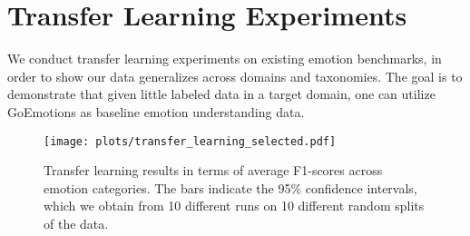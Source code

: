 \documentclass[11pt,a4paper]{article}
\begin{document}
\begin{table}[h!]
\centering
    
    \caption{Results using Ekman's taxonomy.}
    \label{tab:ekman_results}
\end{table}


\section{Transfer Learning Experiments}

We conduct transfer learning experiments on existing emotion benchmarks, in order to show our data generalizes across domains and taxonomies. The goal is to demonstrate that given little labeled data in a target domain, one can utilize GoEmotions as baseline emotion understanding data.

\begin{figure*}[t!]
 \centering
   \centering
   \texttt{[image: plots/transfer\_learning\_selected.pdf]}
   \caption{Transfer learning results in terms of average F1-scores across emotion categories. The bars indicate the 95\% confidence intervals, which we obtain from 10 different runs on 10 different random splits of the data.}
   \label{fig:transfer_results}
\end{figure*}
\end{document}
